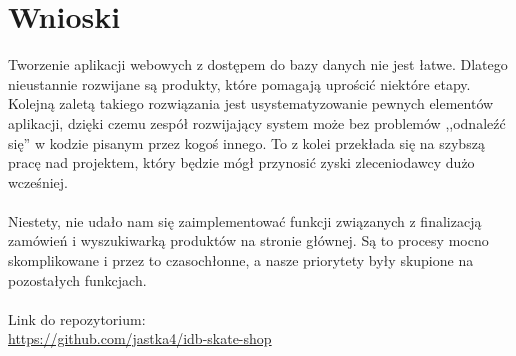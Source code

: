 \documentclass[12pt,a4paper,titlepage]{article}
\begin{document}
\section{Wnioski}
Tworzenie aplikacji webowych z dostępem do bazy danych nie jest łatwe. Dlatego nieustannie rozwijane są produkty, które pomagają uprościć niektóre etapy. Kolejną zaletą takiego rozwiązania jest usystematyzowanie pewnych elementów aplikacji, dzięki czemu zespół rozwijający system może bez problemów ,,odnaleźć się'' w kodzie pisanym przez kogoś innego. To z kolei przekłada się na szybszą pracę nad projektem, który będzie mógł przynosić zyski zleceniodawcy dużo wcześniej. \\\\
Niestety, nie udało nam się zaimplementować funkcji związanych z finalizacją zamówień i wyszukiwarką produktów na stronie głównej. Są to procesy mocno skomplikowane i przez to czasochłonne, a nasze priorytety były skupione na pozostałych funkcjach.\\\\
\large{Link do repozytorium: }\\ \hyperlink{https://github.com/jastka4/idb-skate-shop}{https://github.com/jastka4/idb-skate-shop}

\newpage


\end{document}
